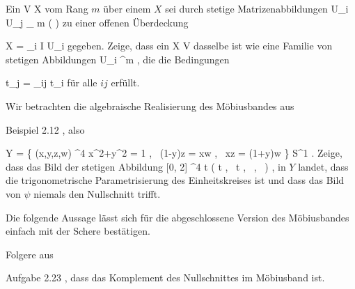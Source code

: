 {}
{





Ein
\maabb {} { V } { X
} {}
vom Rang $m$ über einem
$X$ sei durch stetige Matrizenabbildungen
 { U_i \cap U_j } { _{  m   } \! \left(  \R  \right)
} {}
zu einer offenen Überdeckung

\mavergleichskette
{\vergleichskette
{X
}
{ = }{ \bigcup_{i \in I} U_i
}
{  }{
}
{    }{
}
{   }{
}
}
{}{}{}
gegeben. Zeige, dass ein
 { X } { V
} {}
dasselbe ist wie eine Familie von stetigen Abbildungen
 {U_i } { \R^m
} {,}
die die Bedingungen

\mavergleichskettedisp
{\vergleichskette
{t_j
}
{ =} { \varphi_{ij} t_i
}
{ } {
}
{ } {
}
{ } {
}
}
{}{}{}
für alle $ij$ erfüllt.





}
{} {}

{}
{





Wir betrachten die algebraische Realisierung des Möbiusbandes aus

Beispiel 2.12
,
also

\mavergleichskettedisp
{\vergleichskette
{Y
}
{ =} { \left\{ (x,y,z,w) \in \R^4  \mid   x^2+y^2 = 1 , \, (1-y)z = xw   , \,  xz = (1+y)w    \right\}
}
{ \rightarrow} { S^1
}
{ } {
}
{ } {
}
}
{}{}{.}
Zeige, dass das Bild der stetigen Abbildung
\maabbeledisp {\psi} { [0, 2\pi] } { \R^4
} { t } { \left(  \cos  t   , \,   \sin  t  , \,    , \,                   \right)
} {,}
in $Y$ landet, dass
 die trigonometrische Parametrisierung des Einheitskreises ist und dass das Bild von $\psi$ niemals den Nullschnitt trifft.





}
{} {}

Die folgende Aussage lässt sich für die abgeschlossene Version des Möbiusbandes einfach mit der Schere bestätigen.

{}
{





Folgere aus

Aufgabe 2.23
,
dass das Komplement des Nullschnittes im Möbiusband
ist.





}
{} {}

